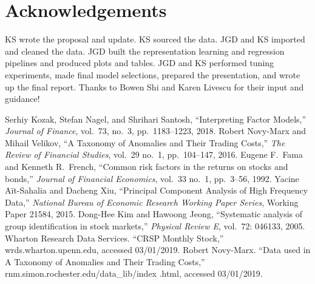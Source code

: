 \documentclass[a4paper]{article}
\begin{document}
    \section{Acknowledgements}
    KS wrote the proposal and update. KS sourced the data. JGD and KS imported and cleaned the data. JGD built the representation learning and regression pipelines and produced plots and tables. JGD and KS performed tuning experiments, made final model selections, prepared the presentation, and wrote up the final report. Thanks to Bowen Shi and Karen Livescu for their input and guidance!   


  \newpage
  \eightpt
  

%

  \begin{thebibliography}{9}
      Serhiy Kozak, Stefan Nagel, and Shrihari Santosh,
      ``Interpreting Factor Models,''
      \textit{Journal of Finance}, vol.~73, no.~3, pp.~1183--1223, 2018.
      Robert Novy-Marx and Mihail Velikov,
      ``A Taxonomy of Anomalies and Their Trading Costs,''
      \textit{The Review of Financial Studies}, vol.~29 no.~1, pp.~104--147, 2016.
      Eugene F.\ Fama and Kenneth R.\ French,
      ``Common risk factors in the returns on stocks and bonds,''
      \textit{Journal of Financial Economics}, vol.~33 no.~1, pp.~3--56, 1992.
    Yacine A{\"i}t-Sahalia and Dacheng Xiu,
    ``Principal Component Analysis of High Frequency Data,''
    \textit{National Bureau of Economic Research Working Paper Series}, Working Paper 21584, 2015.
    Dong-Hee Kim and Hawoong Jeong,
    ``Systematic analysis of group identification in stock markets,''
    \textit{Physical Review E}, vol.~72: 046133, 2005.
	Wharton Research Data Services. ``CRSP Monthly Stock,'' wrds.wharton.upenn.edu, accessed 03/01/2019.
	Robert Novy-Marx. ``Data used in A Taxonomy of Anomalies and Their Trading Costs,'' rnm.simon.rochester.edu/data\_lib/index .html, accessed 03/01/2019.
  \end{thebibliography}
\end{document}
